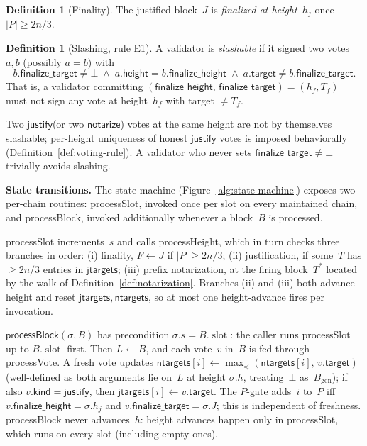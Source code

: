 \ifx\litemode\undefined\documentclass{article}\fi
\newcommand{\genesis}{\ensuremath{B_{\mathrm{gen}}}}
\newcommand{\slot}[0]{\ensuremath{\operatorname{\mathrm{slot}}}}
\newcommand{\target}{\mathsf{target}}
\newcommand{\kind}{\mathsf{kind}}
\newcommand{\height}{\mathsf{height}}
\newcommand{\just}{\ensuremath{\mathsf{justify}}\xspace}
\newcommand{\notar}{\ensuremath{\mathsf{notarize}}\xspace}
\newcommand{\finalizeHeight}{\mathsf{finalize\_height}}
\newcommand{\finalizeTarget}{\mathsf{finalize\_target}}
\newcommand{\jtargets}{\mathsf{jtargets}}
\newcommand{\ntargets}{\mathsf{ntargets}}
\newcommand{\processSlot}{\textsf{processSlot}\xspace}
\newcommand{\processBlock}{\textsf{processBlock}\xspace}
\newcommand{\processHeight}{\textsf{processHeight}\xspace}
\newcommand{\processVote}{\textsf{processVote}\xspace}
\renewcommand{\paragraph}[1]{\vspace{7pt}\noindent\textbf{#1}}
\theoremstyle{plain}
\theoremstyle{definition}
\newtheorem{definition}[theorem]{Definition}
\theoremstyle{remark}
\begin{document}
\begin{definition}[Finality]\label{def:finality}
The justified block~$J$ is \emph{finalized at height~$h_j$} once $|P| \geq 2n/3$.
\end{definition}

\begin{definition}[Slashing, rule E1]\label{def:slashing}
A validator is \emph{slashable} if it signed two votes~$a, b$ (possibly $a = b$) with
\[
  b.\finalizeTarget \neq \bot \;\wedge\; a.\height = b.\finalizeHeight \;\wedge\; a.\target \neq b.\finalizeTarget.
\]
That is, a validator committing $(\finalizeHeight,\, \finalizeTarget) = (h_f, T_f)$ must not sign any vote at height~$h_f$ with target $\neq T_f$.
\end{definition}

Two \just (or two \notar) votes at the same height are not by themselves slashable; per-height uniqueness of honest \just votes is imposed behaviorally (Definition~\ref{def:voting-rule}).
A validator who never sets $\finalizeTarget \neq \bot$ trivially avoids slashing.

\paragraph{State transitions.}
The state machine (Figure~\ref{alg:state-machine}) exposes two per-chain routines: \processSlot, invoked once per slot on every maintained chain, and \processBlock, invoked additionally whenever a block~$B$ is processed.

\processSlot increments~$s$ and calls \processHeight, which in turn checks three branches in order: (i) finality, $F \gets J$ if $|P| \geq 2n/3$; (ii) justification, if some~$T$ has $\geq 2n/3$ entries in $\jtargets$; (iii) prefix notarization, at the firing block~$T^*$ located by the walk of Definition~\ref{def:notarization}.
Branches (ii) and (iii) both advance height and reset $\jtargets, \ntargets$, so at most one height-advance fires per invocation.

$\processBlock(\sigma, B)$ has precondition $\sigma.s = B.\slot$: the caller runs \processSlot up to $B.\slot$ first.
Then $L \gets B$, and each vote~$v$ in~$B$ is fed through \processVote.
A fresh vote updates $\ntargets[i] \gets \max_{\preceq}(\ntargets[i],\, v.\target)$ (well-defined as both arguments lie on~$L$ at height $\sigma.h$, treating~$\bot$ as~$\genesis$); if also $v.\kind = \just$, then $\jtargets[i] \gets v.\target$.
The $P$-gate adds~$i$ to~$P$ iff $v.\finalizeHeight = \sigma.h_j$ and $v.\finalizeTarget = \sigma.J$; this is independent of freshness.
\processBlock never advances~$h$: height advances happen only in \processSlot, which runs on every slot (including empty ones).
\end{document}
